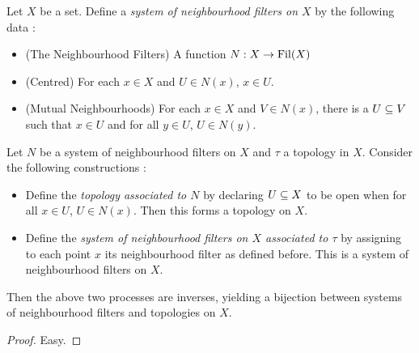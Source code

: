 \documentclass[main.tex]{subfiles}
\begin{document}
\begin{prop}
  
  Let $X$ be a set. 
  Define a \emph{system of neighbourhood filters on $X$} by the following data :
  \begin{itemize}
    \item (The Neighbourhood Filters) 
    A function $N : X \to \operatorname{Fil}(X)$
    \item (Centred) 
    For each $x \in X$ and $U \in N(x)$, $x \in U$.
    \item (Mutual Neighbourhoods)
    For each $x \in X$ and $V \in N(x)$,
    there is a $U \subseteq V$ such that 
    $x \in U$ and for all $y \in U$, $U \in N(y)$.
  \end{itemize}

  Let $N$ be a system of neighbourhood filters on $X$ and 
  $\tau$ a topology in $X$.
  Consider the following constructions : 
  \begin{itemize}
    \item Define the \emph{topology associated to $N$} by 
    declaring $U \subseteq X$ to be open when 
    for all $x \in U$, $U \in N(x)$.
    Then this forms a topology on $X$.
    \item Define the \emph{system of neighbourhood filters on $X$
    associated to $\tau$} by
    assigning to each point $x$ its neighbourhood filter as defined before.
    This is a system of neighbourhood filters on $X$.
  \end{itemize}
  Then the above two processes are inverses,
  yielding a bijection between systems of neighbourhood filters and 
  topologies on $X$.
  
\end{prop}
\begin{proof}
  Easy. 
\end{proof}
\end{document}

